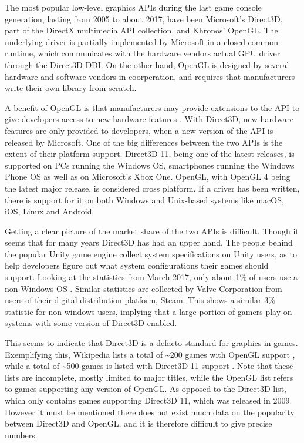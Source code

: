The most popular low-level graphics \glspl{API} during the last game console generation, lasting from 2005 to about 2017, have been Microsoft’s Direct3D, part of the DirectX multimedia API collection, and Khronos’ OpenGL.  
The underlying driver is partially implemented by Microsoft in a closed common runtime, which communicates with the hardware vendors actual \gls{GPU} driver through the Direct3D \gls{DDI}\cite{dxDDI}.
On the other hand, OpenGL is designed by several hardware and software vendors in coorperation, and requires that manufacturers write their own library from scratch. 

A benefit of OpenGL is that manufacturers may provide extensions to the \gls{API} to give developers access to new hardware features \cite{openGLExtensions}.
With Direct3D, new hardware features are only provided to developers, when a new version of the \gls{API} is released by Microsoft. 
One of the big differences between the two \glspl{API} is the extent of their platform support.
Direct3D 11, being one of the latest releases, is supported on PCs running the Windows \gls{OS}, smartphones running the Windows Phone \gls{OS} as well as on Microsoft’s Xbox One.
OpenGL, with OpenGL 4 being the latest major release, is considered cross platform.
If a driver has been written, there is support for it on both Windows and Unix-based systems like macOS, iOS, Linux and Android. 

Getting a clear picture of the market share of the two \glspl{API} is difficult.
Though it seems that for many years Direct3D has had an upper hand.
The people behind the popular Unity game engine collect system specifications on Unity users, as to help developers figure out what system configurations their games should support.
Looking at the statistics from March 2017, only about 1\% of users use a non-Windows \gls{OS} \cite{unityStats}.
Similar statistics are collected by Valve Corporation from users of their digital distribution platform, Steam.
This shows a similar 3\% statistic for non-windows users\cite{steamStats}, implying that a large portion of gamers play on systems with some version of Direct3D enabled.

This seems to indicate that Direct3D is a defacto-standard for graphics in games. 
Exemplifying this, Wikipedia lists a total of \textasciitilde{200} games with OpenGL support \cite{wikiOpenGLGames}, while a total of \textasciitilde{500} games is listed with Direct3D 11 support \cite{wikiDX11Games}. 
Note that these lists are incomplete, mostly limited to major titles, while the OpenGL list refers to games supporting any version of OpenGL.
As opposed to the Direct3D list, which only contains games supporting Direct3D 11, which was released in 2009.
However it must be mentioned there does not exist much data on the popularity between Direct3D and OpenGL, and it is therefore difficult to give precise numbers.
   
